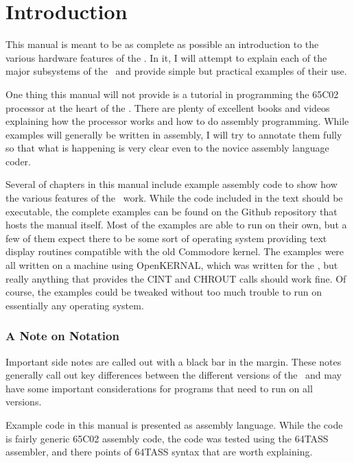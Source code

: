 \chapter{Introduction}

This manual is meant to be as complete as possible an introduction to the various hardware features of the \jr. In it, I will attempt to explain each of the major subsystems of the \jr\ and provide simple but practical examples of their use.

One thing this manual will not provide is a tutorial in programming the 65C02 processor at the heart of the \jr. There are plenty of excellent books and videos explaining how the processor works and how to do assembly programming. While examples will generally be written in assembly, I will try to annotate them fully so that what is happening is very clear even to the novice assembly language coder.

Several of chapters in this manual include example assembly code to show how the various features of the \jr\ work. While the code included in the text should be executable, the complete examples can be found on the Github repository that hosts the manual itself. Most of the examples are able to run on their own, but a few of them expect there to be some sort of operating system providing text display routines compatible with the old Commodore kernel. The examples were all written on a machine using OpenKERNAL, which was written for the \jr, but really anything that provides the CINT and CHROUT calls should work fine. Of course, the examples could be tweaked without too much trouble to run on essentially any operating system.

\subsection*{A Note on Notation}

Important side notes are called out with a black bar in the margin. These notes generally call out key differences between the different versions of the \jr\ and may have some important considerations for programs that need to run on all versions.

Example code in this manual is presented as assembly language. While the code is fairly generic 65C02 assembly code, the code was tested using the 64TASS assembler, and there points of 64TASS syntax that are worth explaining.

